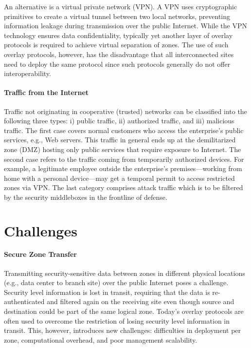 An alternative is a virtual private
network (VPN). A VPN uses cryptographic primitives to create a virtual tunnel between two
local networks, preventing information leakage during transmission over the public Internet.
While the VPN technology ensures data confidentiality, typically yet another layer of overlay
protocols is required to achieve virtual separation of zones. The use of such overlay
protocols, however, has the disadvantage that all interconnected sites need to deploy the same
protocol since such protocols generally do not offer interoperability.

\paragraph{Traffic from the Internet}
Traffic not originating in cooperative (trusted) networks can be classified
into the following three types: i) public traffic, ii) authorized traffic, and iii)
malicious traffic. The first case covers normal customers who access the enterprise's
public services, e.g., Web servers. This traffic in general ends up at the demilitarized zone
(DMZ) hosting only public services that require exposure to Internet.
The second case refers to the traffic coming from temporarily authorized devices. For example,
a legitimate employee outside the enterprise's premises---working from home with a personal
device---may get a temporal permit to access restricted zones via VPN. The last
category comprises attack traffic which is to be filtered by the security middleboxes in the
frontline of defense.

\section{Challenges}
\label{sec:challenges}

\paragraph{Secure Zone Transfer}
Transmitting security-sensitive data between zones in different physical locations (e.g.,
data center to branch site) over the public Internet poses a challenge.
Security level information is lost in transit, requiring that the data is re-authenticated and
filtered again on the receiving site even though source and destination could be part of the
same logical zone.
Today's overlay protocols are often used to overcome the restriction of losing
security level information in transit. This, however, introduces new challenges: difficulties
in deployment per zone, computational overhead, and poor management scalability.

